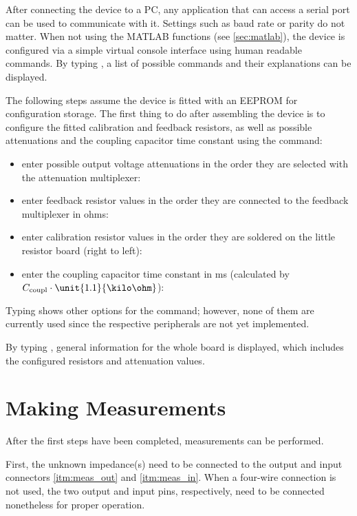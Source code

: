 After connecting the device to a PC, any application that can access a serial port can be used to communicate with it.
Settings such as baud rate or parity do not matter.
When not using the MATLAB functions (see \autoref{sec:matlab}), the device is configured via a simple virtual console
interface using human readable commands. By typing , a list of possible commands and their
explanations can be displayed.

The following steps assume the device is fitted with an EEPROM for configuration storage.
The first thing to do after assembling the device is to configure the fitted calibration and feedback resistors, as well
as possible attenuations and the coupling capacitor time constant using the  command:
\begin{itemize}
	\item enter possible output voltage attenuations in the order they are selected with the attenuation multiplexer:
  \item enter feedback resistor values in the order they are connected to the feedback multiplexer in ohms:
  \item enter calibration resistor values in the order they are soldered on the little resistor board (right to left):
  \item enter the coupling capacitor time constant in ms (calculated by $ C_\text{coupl} \cdot \unit{1.1}{\kilo\ohm} $):
\end{itemize}
Typing  shows other options for the  command; however, none of them are currently
used since the respective peripherals are not yet implemented.

By typing , general information for the whole board is displayed, which includes the configured
resistors and attenuation values.


\section{Making Measurements}

After the first steps have been completed, measurements can be performed.

First, the unknown impedance(s) need to be connected to the output and input connectors \ref{itm:meas_out} and
\ref{itm:meas_in}. When a four-wire connection is not used, the two output and input pins, respectively, need to be
connected nonetheless for proper operation.

